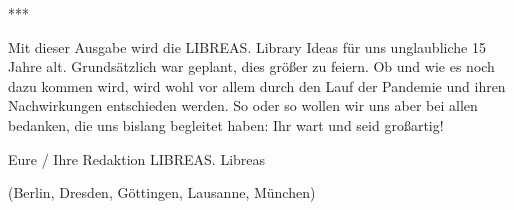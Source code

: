 \documentclass[a4paper,
fontsize=11pt,
oneside,
numbers=noperiodatend,
parskip=half-,
bibliography=totoc,
final
]{scrartcl}
\begin{document}
***

Mit dieser Ausgabe wird die LIBREAS. Library Ideas für uns unglaubliche
15 Jahre alt. Grundsätzlich war geplant, dies größer zu feiern. Ob und
wie es noch dazu kommen wird, wird wohl vor allem durch den Lauf der
Pandemie und ihren Nachwirkungen entschieden werden. So oder so wollen
wir uns aber bei allen bedanken, die uns bislang begleitet haben: Ihr
wart und seid großartig!

Eure / Ihre Redaktion LIBREAS. Libreas

(Berlin, Dresden, Göttingen, Lausanne, München)

\end{document}
